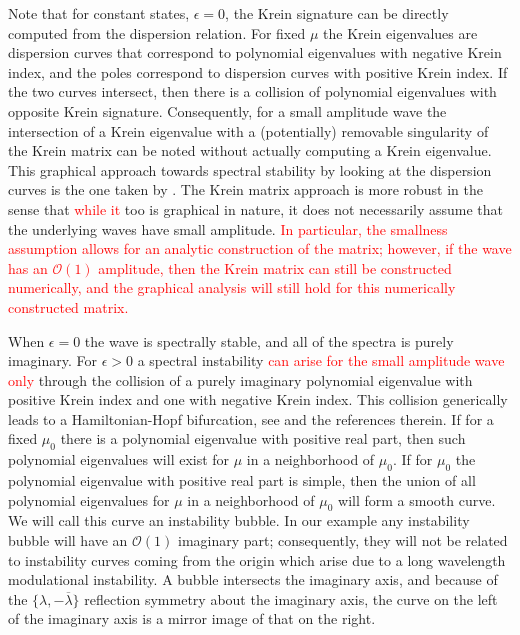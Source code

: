 \documentclass[review,onefignum,onetabnum]{siamart171218}
\newcommand{\calO}{\mathcal{O}}
\newcommand{\revised}[1]{ \textcolor{red}{#1} }
\begin{document}
\begin{remark}
Note that for constant states, $\epsilon=0$, the Krein signature can be directly computed from the dispersion relation.  For fixed $\mu$ the Krein
eigenvalues are dispersion curves that correspond to polynomial eigenvalues
with negative Krein index, and the poles correspond to dispersion curves with
positive Krein index. If the two curves intersect, then there is a collision
of polynomial eigenvalues with opposite Krein signature. Consequently, for a small amplitude wave the intersection of a Krein eigenvalue with a (potentially) removable singularity of the Krein matrix can be noted
without actually computing a Krein eigenvalue. This graphical
approach towards spectral stability by looking at the dispersion curves is the one taken by \cite{deconinck:hfi16,kollar:dco19,trichtchenko:sop18}. The Krein matrix approach is more robust in the sense that \revised{while it} too is graphical in nature, it does not necessarily assume that the underlying waves have small amplitude. \revised{In particular, the smallness assumption allows for an analytic construction of the matrix; however, if the wave has an $\calO(1)$ amplitude, then the Krein matrix can still be constructed numerically, and the graphical analysis will still hold for this numerically constructed matrix.}
\end{remark}

When $\epsilon=0$ the wave is spectrally stable, and all of the spectra is purely imaginary. For $\epsilon>0$ a spectral instability \revised{can arise for the small amplitude wave only} through the collision of a purely imaginary
polynomial eigenvalue with positive Krein index and one with negative Krein
index. This collision generically leads to a Hamiltonian-Hopf bifurcation,
see \cite[Chapter~7.1.2]{kapitula:sad13} and the references therein. If for a fixed $\mu_0$ there is a polynomial eigenvalue
with positive real part, then such polynomial eigenvalues will exist for $\mu$ in a
neighborhood of $\mu_0$. If for $\mu_0$ the polynomial eigenvalue with positive real part is simple, then the union of all polynomial eigenvalues for $\mu$ in a neighborhood of $\mu_0$ will form a smooth curve. We will call this curve an instability bubble. In our example any instability bubble will have an $\calO(1)$
imaginary part; consequently, they will not be related to instability curves coming from the origin which arise due to a long wavelength modulational instability.
A bubble intersects the imaginary axis, and because of the
$\{\lambda,-\overline{\lambda}\}$ reflection symmetry about the imaginary
axis, the curve on the left of the imaginary axis is a mirror image of that
on the right.
\end{document}
